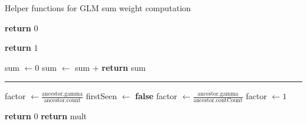 \begin{algorithm}[t]
  \caption{Helper functions for GLM sum weight computation}
  \label{alg:weightedsum-glm-helper}
  \begin{algorithmic}[1]
        \label{ln:highhlp-count-nonzero}
        \State \textbf{return} $0$
          \label{ln:highhlp-return-zero}
      \EndIf

      \vspace{0.7em}
        \label{ln:highhlp-isparent}
        \State \textbf{return} $1$
          \label{ln:highhlp-return-one}
      \EndIf

      \vspace{0.7em}
      \State sum $\gets 0$
        \label{ln:highhlp-init-sum}
        \label{ln:highhlp-for}
          \label{ln:highhlp-isancestor}
          \State sum $\gets$ sum $+ {}$ 
            \label{ln:highhlp-add}
        \EndIf
      \EndFor
      \State \textbf{return} sum
        \label{ln:highhlp-return}
    \EndFunction

    \vspace{0.7em}
    \Statex\hrule

        \label{ln:lowhlp-count-nonzero}
        \State factor $\gets \frac{\text{ancestor.gamma}}{\text{ancestor.count}}$
          \label{ln:lowhlp-from-highhlp}
        \State firstSeen $\gets$ \textbf{false}
          \label{ln:lowhlp-firstseen}
        \label{ln:lowhlp-contcount-nonzero}
        \State factor $\gets \frac{\text{ancestor.gamma}}{\text{ancestor.contCount}}$
          \label{ln:lowhlp-from-lowhlp}
      \Else
        \label{ln:lowhlp-else}
        \State factor $\gets 1$
          \label{ln:lowhlp-one}
      \EndIf

      \vspace{0.7em}
        \label{ln:lowhlp-isparent}
          \label{ln:lowhlp-isseen}
          \State \textbf{return} $0$
            \label{ln:lowhlp-return-zero}
        \EndIf{}
        \State \textbf{return} mult
          \label{ln:lowhlp-return-mult}
      \EndIf


\end{algorithmic}
\end{algorithm}

